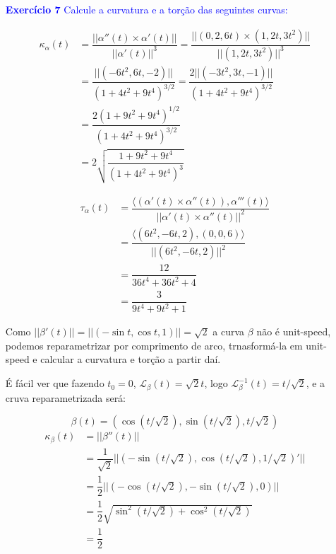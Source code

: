\documentclass[12pt,letterpaper]{article}
\newcommand\lcur{\mathcal{L}}
\newcommand{\real}{\mathbb{R}}
\newcommand{\ex}[1]{\textcolor{blue}{\textbf{Exercício #1}}}
\newcommand{\blue}[1]{{\color{blue}{#1}}}
\begin{document}
\begin{enumerate}
	\item[\ex{7}] \textcolor{blue}{Calcule a curvatura e a torção das seguintes curvas:}
		\begin{enumerate}[(a)]
			\blue{
			\item $\alpha(t)=(t,t^2,t^3),t\in\real$}
				\begin{align*}
					\kappa_{\alpha}(t)&=\dfrac{||\alpha''(t)\times\alpha'(t)||}{||\alpha'(t)||^3}
					=\dfrac{||(0,2,6t)\times(1,2t,3t^2)||}{||(1,2t,3t^2)||^3}\\
					&=\dfrac{||(-6 t^2, 6 t, -2)||}{(1+4t^2+9t^4)^{3/2}}
					=\dfrac{2||(-3t^2,3t,-1)||}{(1+4t^2+9t^4)^{3/2}}\\
					&=\dfrac{2(1+9t^2+9t^4)^{1/2}}{(1+4t^2+9t^4)^{3/2}}\\
					&=2\sqrt{\dfrac{1+9t^2+9t^4}{(1+4t^2+9t^4)^3}}
				\end{align*}
			
			
			
			\begin{align*}
				\tau_\alpha(t)&=\dfrac{\langle(\alpha'(t)\times\alpha''(t)),\alpha'''(t)\rangle}{||\alpha'(t)\times\alpha''(t)||^2}\\
				&=\dfrac{\langle(6 t^2, -6 t, 2),(0,0,6)\rangle}{||(6 t^2, -6 t, 2)||^2}\\
				&=\dfrac{12}{36t^4+36t^2+4}\\
				&=\dfrac{3}{9t^4+9t^2+1}
			\end{align*}
		
		\blue{\item $\beta(t)=(\cos t,\sin t,t),t\in\real$}
		
		Como $||\beta'(t)||=||(-\sin t,\cos t,1)||=\sqrt2$ a curva $\beta$ não é unit-speed, podemos reparametrizar por comprimento de arco, trnasformá-la em unit-speed e calcular a curvatura e torção a partir daí. 
		
		É fácil ver que fazendo $t_0=0$, $\lcur_\beta(t)=\sqrt2t$, logo $\lcur^{-1}_\beta(t)=t/\sqrt2$, e a cruva reparametrizada será:
		
		$$\beta(t)=(\cos(t/\sqrt2),\sin(t/\sqrt2),t/\sqrt2)$$
		\begin{align*}
			\kappa_{\beta}(t)&=||\beta''(t)||\\
			&=\dfrac{1}{\sqrt2}||(-\sin (t/\sqrt2),\cos (t/\sqrt2),1/\sqrt2)'||\\
			&=\dfrac{1}{2}||(-\cos (t/\sqrt2),-\sin (t/\sqrt2),0)||\\
			&=\dfrac{1}{2}\sqrt{\sin^2(t/\sqrt2)+\cos^2(t/\sqrt2)}\\
			&=\dfrac{1}{2}
		\end{align*}
		

\end{enumerate}
\end{enumerate}
\end{document}
